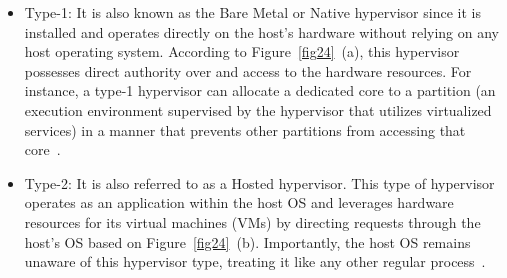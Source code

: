     
    
    \begin{itemize}
    \item Type-1: %
    It is also known as the Bare Metal or Native hypervisor since it is installed and operates directly on the host's hardware without relying on any host operating system. According to Figure~\ref{fig24}~(a), this hypervisor possesses direct authority over and access to the hardware resources. For instance, a type-1 hypervisor can allocate a dedicated core to a partition (an execution environment supervised by the hypervisor that utilizes virtualized services) in a manner that prevents other partitions from accessing that core~\cite{askaripoor2022architecture,9968908}.
    
    
    \item Type-2: %
    It is also referred to as a Hosted hypervisor. This type of hypervisor operates as an application within the host OS and leverages hardware resources for its virtual machines (VMs) by directing requests through the host's OS based on Figure~\ref{fig24}~(b). Importantly, the host OS remains unaware of this hypervisor type, treating it like any other regular process~\cite{9968908,askaripoor2022architecture}.
    \end{itemize}
 
